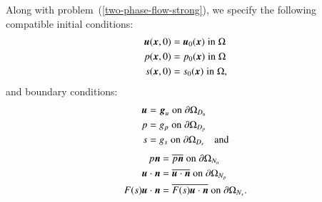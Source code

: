 Along with problem~(\ref{two-phase-flow-strong}), we specify the
following compatible initial conditions:
\begin{equation}
  \begin{split}
    \mbox{\boldmath$ u$}(\mbox{\boldmath$ x$}, 0) & = \mbox{\boldmath$ u$}_{0}(\mbox{\boldmath$ x$})\; \mathrm{in}\; \Omega\\
    p(\mbox{\boldmath$ x$}, 0) & = p_{0}(\mbox{\boldmath$ x$})\; \mathrm{in}\; \Omega\\
    s(\mbox{\boldmath$ x$}, 0) & = s_{0}(\mbox{\boldmath$ x$})\; \mathrm{in}\; \Omega,
  \end{split}
\end{equation}
and boundary conditions:
\begin{equation}
  \begin{split}
    \mbox{\boldmath$ u$} & = \mbox{\boldmath$ g$}_{u}\; \mathrm{on}\; \partial \Omega_{D_{u}}\\
    p & = g_{p}\; \mathrm{on}\; \partial \Omega_{D_{p}}\\
    s & = g_{s}\; \mathrm{on}\; \partial \Omega_{D_{s}}
    \quad \mathrm{and}
  \end{split}
\end{equation}
\begin{equation}
  \begin{split}
    p \mbox{\boldmath$ n$} & = \overline{p \mbox{\boldmath$ n$}}\; \mathrm{on}\; \partial \Omega_{N_{u}}\\
    \mbox{\boldmath$ u$} \cdot \mbox{\boldmath$ n$} & = \overline{\mbox{\boldmath$ u$} \cdot \mbox{\boldmath$ n$}}\;
    \mathrm{on}\; \partial \Omega_{N_{p}}\\
    F(s) \mbox{\boldmath$ u$} \cdot \mbox{\boldmath$ n$} & = \overline{F(s) \mbox{\boldmath$ u$} \cdot \mbox{\boldmath$ n$}}\;
    \mathrm{on}\; \partial \Omega_{N_{s}}.
  \end{split}
\end{equation}

